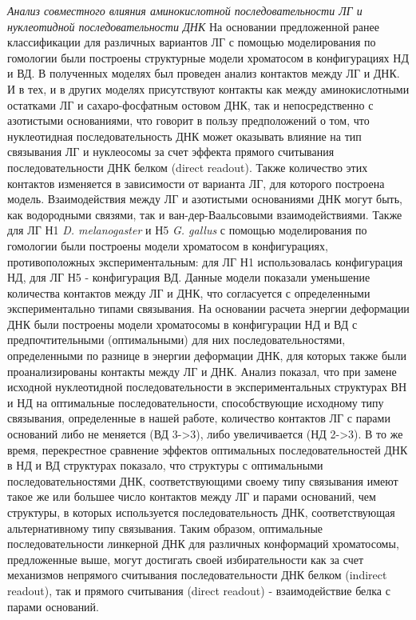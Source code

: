 \emph{Анализ совместного влияния аминокислотной последовательности ЛГ и нуклеотидной последовательности ДНК}
На основании предложенной ранее классификации для различных вариантов ЛГ с помощью моделирования по гомологии были построены структурные модели хроматосом в конфигурациях НД и ВД. В полученных моделях был проведен анализ контактов между ЛГ и ДНК.
И в тех, и в других моделях присутствуют контакты как между аминокислотными остатками ЛГ и сахаро-фосфатным остовом ДНК, так и непосредственно с азотистыми основаниями, что говорит в пользу предположений о том, что нуклеотидная последовательность ДНК может оказывать влияние на тип связывания ЛГ и нуклеосомы за счет эффекта прямого считывания последовательности ДНК белком (direct readout). Также количество этих контактов изменяется в зависимости от варианта ЛГ, для которого построена модель. Взаимодействия между ЛГ и азотистыми основаниями ДНК могут быть, как водородными связями, так и ван-дер-Ваальсовыми взаимодействиями. 
Также для ЛГ Н1 \textit{D. melanogaster} и Н5 \textit{G. gallus} с помощью моделирования по гомологии были построены модели хроматосом в конфигурациях, противоположных экспериментальным: для ЛГ Н1 использовалась конфигурация НД, для ЛГ Н5 - конфигурация ВД. Данные модели показали уменьшение количества контактов между ЛГ и ДНК, что согласуется с определенными экспериментально типами связывания.
На основании расчета энергии деформации ДНК были построены модели хроматосомы в конфигурации НД и ВД с предпочтительными (оптимальными) для них последовательностями, определенными по разнице в энергии деформации ДНК, для которых также были проанализированы контакты между ЛГ и ДНК. Анализ показал, что при замене исходной нуклеотидной последовательности в экспериментальных структурах ВН и НД на оптимальные последовательности, способствующие исходному типу связывания, определенные в нашей работе, количество контактов ЛГ с парами оснований либо не меняется (ВД 3->3), либо увеличивается (НД 2->3). В то же время, перекрестное сравнение эффектов оптимальных последовательностей ДНК в НД и ВД структурах показало, что структуры с оптимальными последовательностями ДНК, соответствующими своему типу связывания имеют такое же или большее число контактов между ЛГ и парами оснований, чем структуры, в которых используется последовательность ДНК, соответствующая альтернативному типу связывания. Таким образом, оптимальные последовательности линкерной ДНК для различных конформаций хроматосомы, предложенные выше, могут достигать своей избирательности как за счет механизмов непрямого считывания  последовательности ДНК белком (indirect readout), так и прямого считывания (direct readout) - взаимодействие белка с парами оснований.
